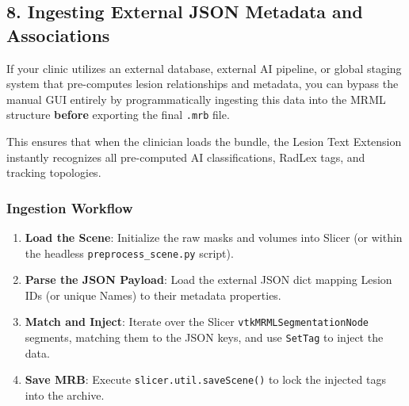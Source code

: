 \documentclass[a4paper,10pt]{article}
\begin{document}
\subsection{8. Ingesting External JSON Metadata and Associations}
If your clinic utilizes an external database, external AI pipeline, or global staging system that pre-computes lesion relationships and metadata, you can bypass the manual GUI entirely by programmatically ingesting this data into the MRML structure \textbf{before} exporting the final \texttt{.mrb} file. 

This ensures that when the clinician loads the bundle, the Lesion Text Extension instantly recognizes all pre-computed AI classifications, RadLex tags, and tracking topologies.

\subsubsection*{Ingestion Workflow}
\begin{enumerate}
    \item \textbf{Load the Scene}: Initialize the raw masks and volumes into Slicer (or within the headless \texttt{preprocess\_scene.py} script).
    \item \textbf{Parse the JSON Payload}: Load the external JSON dict mapping Lesion IDs (or unique Names) to their metadata properties.
    \item \textbf{Match and Inject}: Iterate over the Slicer \texttt{vtkMRMLSegmentationNode} segments, matching them to the JSON keys, and use \texttt{SetTag} to inject the data.
    \item \textbf{Save MRB}: Execute \texttt{slicer.util.saveScene()} to lock the injected tags into the archive.
\end{enumerate}
\end{document}
